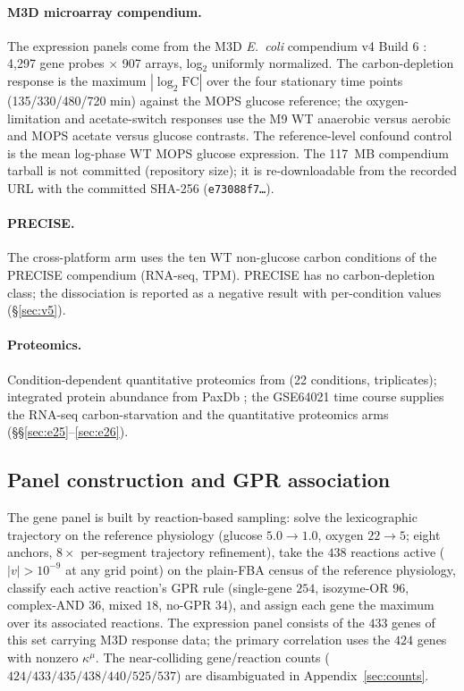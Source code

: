 \documentclass[11pt,a4paper]{article}
\theoremstyle{plain}
\theoremstyle{definition}
\theoremstyle{remark}
\newcommand{\kmu}{\kappa^{\mu}}
\begin{document}
\paragraph{M3D microarray compendium.} The expression panels come from
the M3D \emph{E.~coli} compendium v4 Build 6
\citep{faith2008, faith2007}: 4{,}297 gene probes $\times$ 907
arrays, log$_2$ uniformly normalized. The carbon-depletion response
is the maximum $|\log_2\mathrm{FC}|$ over the four stationary
time points (135/330/480/720 min) against the MOPS glucose
reference; the oxygen-limitation and acetate-switch responses use
the M9 WT anaerobic versus aerobic and MOPS acetate versus glucose
contrasts. The reference-level confound control is the mean
log-phase WT MOPS glucose expression. The 117~MB compendium
tarball is not committed (repository size); it is re-downloadable
from the recorded URL with the committed SHA-256
(\texttt{e73088f7\ldots}).

\paragraph{PRECISE.} The cross-platform arm uses the ten WT
non-glucose carbon conditions of the PRECISE compendium
\citep{sastry2019} (RNA-seq, TPM). PRECISE has no carbon-depletion class; the dissociation is reported as a negative result with per-condition values (\S\ref{sec:v5}).

\paragraph{Proteomics.} Condition-dependent quantitative proteomics
from \citet{schmidt2016} (22 conditions, triplicates); integrated
protein abundance from PaxDb \citep{wang2015}; the GSE64021
\citep{barrett2013} time course supplies the RNA-seq
carbon-starvation and the quantitative proteomics arms (\S\S\ref{sec:e25}--\ref{sec:e26}).

\subsection{Panel construction and GPR association}

The gene panel is built by reaction-based sampling: solve the lexicographic trajectory on the reference physiology (glucose $5.0 \to
1.0$, oxygen $22 \to 5$; eight anchors, $8\times$ per-segment
trajectory refinement), take the $438$ reactions active
($|v| > 10^{-9}$ at any grid point) on the plain-FBA census of the
reference physiology,
classify each active reaction's GPR rule (single-gene $254$,
isozyme-OR $96$, complex-AND $36$, mixed $18$, no-GPR $34$), and
assign each gene the maximum over its associated reactions. The expression panel consists of the $433$ genes of this set carrying M3D response
data; the primary correlation uses the $424$ genes with nonzero
$\kmu$. The near-colliding gene/reaction counts
($424/433/435/438/440/525/537$) are disambiguated in Appendix~\ref{sec:counts}.
\end{document}
